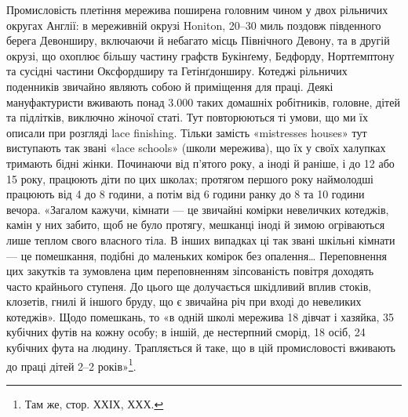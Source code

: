 Промисловість плетіння мережива поширена головним чином
у двох рільничих округах Англії: в мереживній окрузі Honiton,
20--30 миль поздовж південного берега Девонширу, включаючи
й небагато місць Північного Девону, та в другій окрузі, що
охоплює більшу частину графств Букінґему, Бедфорду, Нортґемптону
та сусідні частини Оксфордширу та Гетінґдонширу.
Котеджі рільничих поденників звичайно являють собою й приміщення
для праці. Деякі мануфактуристи вживають понад
\num{3.000} таких домашніх робітників, головне, дітей та підлітків,
виключно жіночої статі. Тут повторюються ті умови, що ми їх
описали при розгляді lace finishing. Тільки замість «mistresses
houses» тут виступають так звані «lace schools» (школи мережива),
що їх у своїх халупках тримають бідні жінки. Починаючи від
п’ятого року, а іноді й раніше, і до 12 або 15 року, працюють
діти по цих школах; протягом першого року наймолодші працюють
від 4 до 8 години, а потім від 6 години ранку до 8 та 10 години
вечора. «Загалом кажучи, кімнати — це звичайні комірки невеличких
котеджів, камін у них забито, щоб не було протягу, мешканці
іноді й зимою огріваються лише теплом свого власного
тіла. В інших випадках ці так звані шкільні кімнати — це помешкання,
подібні до маленьких комірок без опалення\dots{} Переповнення
цих закутків та зумовлена цим переповненням зіпсованість
повітря доходять часто крайнього ступеня. До цього ще
долучається шкідливий вплив стоків, клозетів, гнилі й іншого
бруду, що є звичайна річ при вході до невеликих котеджів». Щодо
помешкань, то «в одній школі мережива 18 дівчат і хазяйка,
35 кубічних футів на кожну особу; в іншій, де нестерпний сморід,
18 осіб, 24 кубічних фута на людину. Трапляється й таке, що
в цій промисловості вживають до праці дітей 2--2 років»\footnote{
Там же, стор. ХХІХ, ХХХ.
}.

